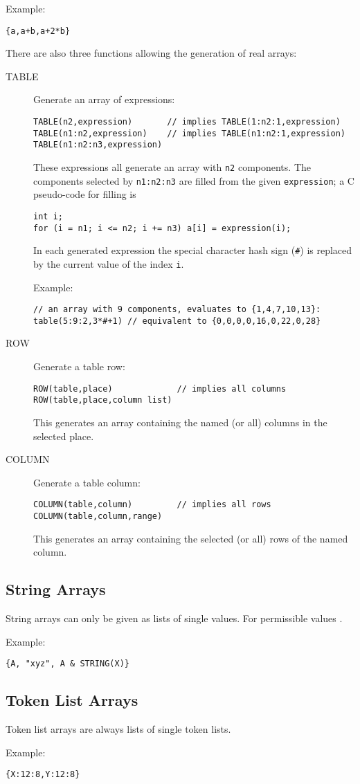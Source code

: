 \noindent Example:
\begin{verbatim}
{a,a+b,a+2*b}
\end{verbatim}
There are also three functions allowing the generation of real arrays:
\begin{description}
\item[TABLE]
  Generate an array of expressions:
\begin{verbatim}
TABLE(n2,expression)       // implies TABLE(1:n2:1,expression)
TABLE(n1:n2,expression)    // implies TABLE(n1:n2:1,expression)
TABLE(n1:n2:n3,expression)
\end{verbatim}
  These expressions all generate an array with \texttt{n2} components.
  The components selected by \texttt{n1:n2:n3} are filled from the given
  \texttt{expression};
  a C pseudo-code for filling is
\begin{verbatim}
int i;
for (i = n1; i <= n2; i += n3) a[i] = expression(i);
\end{verbatim}
  In each generated expression the special character hash sign (\texttt{\#})
  is replaced by the current value of the index \texttt{i}.
  \par
  \noindent Example:
\begin{verbatim}
// an array with 9 components, evaluates to {1,4,7,10,13}:
table(5:9:2,3*#+1) // equivalent to {0,0,0,0,16,0,22,0,28}
\end{verbatim}
\item[ROW]
  Generate a table row:
\begin{verbatim}
ROW(table,place)             // implies all columns
ROW(table,place,column list)
\end{verbatim}
  This generates an array containing the named (or all) columns in the
  selected place. 
\item[COLUMN]
  Generate a table column:
\begin{verbatim}
COLUMN(table,column)         // implies all rows
COLUMN(table,column,range)
\end{verbatim}
  This generates an array containing the selected (or all) rows of the
  named column.
\end{description}

\subsection{String Arrays}
\label{sec:strarray}
String arrays can only be given as lists of single values.
For permissible values .
\par
\noindent Example:
\begin{verbatim}
{A, "xyz", A & STRING(X)}
\end{verbatim}

\subsection{Token List Arrays}
\label{sec:tokarray}
Token list arrays are always lists of single token lists.
\par
\noindent Example:
\begin{verbatim}
{X:12:8,Y:12:8}
\end{verbatim}

